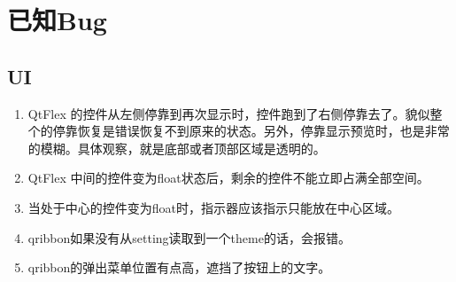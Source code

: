 \section{已知Bug}

\subsection{UI}

\begin{enumerate}
	\item QtFlex 的控件从左侧停靠到再次显示时，控件跑到了右侧停靠去了。貌似整个的停靠恢复是错误恢复不到原来的状态。另外，停靠显示预览时，也是非常的模糊。具体观察，就是底部或者顶部区域是透明的。
	\item QtFlex 中间的控件变为float状态后，剩余的控件不能立即占满全部空间。
	\item 当处于中心的控件变为float时，指示器应该指示只能放在中心区域。
	
	\item qribbon如果没有从setting读取到一个theme的话，会报错。
	
	\item qribbon的弹出菜单位置有点高，遮挡了按钮上的文字。
\end{enumerate}